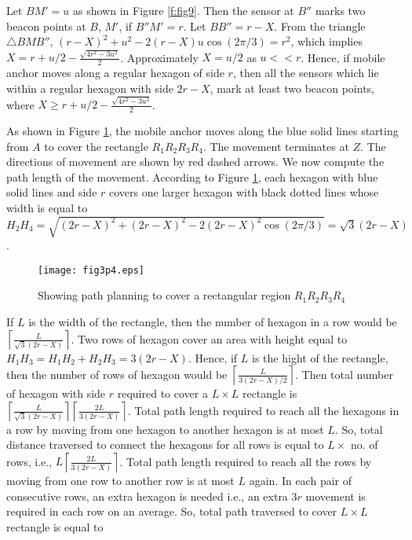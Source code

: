 \documentclass[preprint,11pt]{elsarticle}
\begin{document}
Let $BM'=u$ as shown in Figure \ref{f:fig9}. Then the sensor at $B''$ marks two beacon points at $B$, $M'$, if $B''M'=r$.
Let $BB''=r-X$. From the triangle  $\triangle BMB''$, $(r-X)^2+u^2-2(r-X)u\cos (2\pi/3)=r^2$, which implies $X=r+u/2-\frac{\sqrt{4r^2-3u^2}}{2}$.
Approximately $X=u/2$ as $u<<r$. Hence, if mobile anchor moves along a regular hexagon of side $r$, then all the sensors which lie within a regular
hexagon with side $2r-X$, mark at least two beacon points, where $X\geq r+u/2-\frac{\sqrt{4r^2-3u^2}}{2}$.

As shown in Figure \ref{f:fig10}, the mobile anchor moves along the blue solid lines starting from $A$ to cover the rectangle $R_1R_2R_3R_4$.
The movement terminates at $Z$.  The directions of movement are shown by red dashed arrows. We now compute the path length of the movement. According to Figure \ref{f:fig10}, each hexagon with blue solid lines and side $r$ covers one larger hexagon with black dotted lines whose width is equal to \\ $H_2H_4=\sqrt{(2r-X)^2+(2r-X)^2-2(2r-X)^2\cos (2\pi/3)}=\sqrt3(2r-X)$.
\begin{figure}[h]
\begin{center}
\texttt{[image: fig3p4.eps]}
\caption{\label{f:fig10} Showing path planning to cover a rectangular region $R_1R_2R_3R_4$}
\end{center}
\end{figure}
If $L$ is the width of the rectangle, then the number of hexagon in a row would be $\left\lceil{\frac{L}{\sqrt3(2r-X)}}\right\rceil$.
Two rows of hexagon cover an area with height equal to $H_1H_3=H_1H_2+H_2H_3=3(2r-X)$. Hence, if $L$ is the hight of
the rectangle, then the number of rows of hexagon would be $\left\lceil{\frac{L}{3(2r-X)/2}}\right\rceil$. Then total number of
hexagon with side $r$ required to cover a $L\times L$ rectangle is $\left\lceil{\frac{L}{\sqrt3(2r-X)}}\right\rceil\left\lceil{\frac{2L}{3(2r-X)}}\right\rceil$.
Total path length required to reach all the hexagons in a row by moving from one hexagon to another hexagon is at most $L$.
So, total distance traversed to connect the hexagons for all rows is equal to $L\times$ no. of rows, i.e., $L\left\lceil{\frac{2L}{3(2r-X)}}\right\rceil$.
Total path length required to reach all the rows by moving from one row to another row is at most $L$ again.
In each pair of consecutive rows, an extra hexagon is needed i.e., an extra $3r$ movement is required in each row on an average.
So, total path traversed to cover $L\times L$ rectangle is equal to
\end{document}
